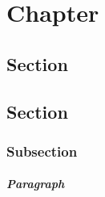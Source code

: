 \chapter{Chapter}
\blindtext
\section{Section}
\blindtext
\section{Section}
\blindtext
\subsection{Subsection}
\blindtext
\paragraph{Paragraph}
\blindtext